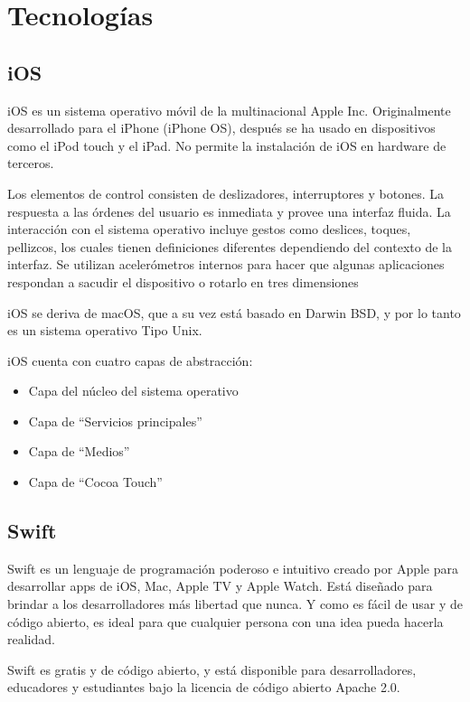 \section{Tecnologías}
\subsection{iOS}
iOS es un sistema operativo móvil de la multinacional Apple Inc. Originalmente desarrollado para el iPhone (iPhone OS), después se ha usado en dispositivos como el iPod touch y el iPad. No permite la instalación de iOS en hardware de terceros.

Los elementos de control consisten de deslizadores, interruptores y botones. La respuesta a las órdenes del usuario es inmediata y provee una interfaz fluida. La interacción con el sistema operativo incluye gestos como deslices, toques, pellizcos, los cuales tienen definiciones diferentes dependiendo del contexto de la interfaz. Se utilizan acelerómetros internos para hacer que algunas aplicaciones respondan a sacudir el dispositivo o rotarlo en tres dimensiones 

iOS se deriva de macOS, que a su vez está basado en Darwin BSD, y por lo tanto es un sistema operativo Tipo Unix.

iOS cuenta con cuatro capas de abstracción: \cite{ios}
\begin{itemize}
    \item Capa del núcleo del sistema operativo
    \item Capa de ``Servicios principales''
    \item Capa de ``Medios''
    \item Capa de ``Cocoa Touch''
\end{itemize}

\subsection{Swift}
Swift es un lenguaje de programación poderoso e intuitivo creado por Apple para desarrollar apps de iOS, Mac, Apple TV y Apple Watch. Está diseñado para brindar a los desarrolladores más libertad que nunca. Y como es fácil de usar y de código abierto, es ideal para que cualquier persona con una idea pueda hacerla realidad.

Swift es gratis y de código abierto, y está disponible para desarrolladores, educadores y estudiantes bajo la licencia de código abierto Apache 2.0. \cite{swift}
\newline


